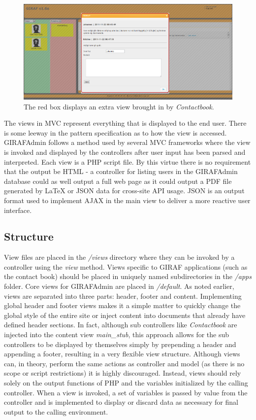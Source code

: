 \begin{figure}
    \begin{center}
    \includegraphics[scale=0.45,angle=90]{img/mvc_details/mvc_detailed_views2_view}
    \caption{\label{implementation_view_views2}The red box displays an extra view brought in by \emph{Contactbook}.}
    \end{center}
\end{figure}

The views in MVC represent everything that is displayed to the end user. There is some leeway in the pattern specification as to how the view is accessed. GIRAFAdmin follows a method used by several MVC frameworks where the view is invoked and displayed by the controllers after user input has been parsed and interpreted. Each view is a PHP script file. By this virtue there is no requirement that the output be HTML - a controller for listing users in the GIRAFAdmin database could as well output a full web page as it could output a PDF file generated by LaTeX or JSON data for cross-site API usage. JSON is an output format used to implement AJAX in the main view to deliver a more reactive user interface.

\subsection{Structure}
View files are placed in the \emph{/views} directory where they can be invoked by a controller using the \emph{view} method. Views specific to GIRAF applications (such as the contact book) should be placed in uniquely named subdirectories in the \emph{/apps} folder. Core views for GIRAFAdmin are placed in \emph{/default}.
As noted earlier, views are separated into three parts: header, footer and content. Implementing global header and footer views makes it a simple matter to quickly change the global style of the entire site or inject content into documents that already have defined header sections. In fact, although sub controllers like \emph{Contactbook} are injected into the content view \emph{main\_stub}, this approach allows for the sub controllers to be displayed by themselves simply by prepending a header and appending a footer, resulting in a very flexible view structure.
Although views can, in theory, perform the same actions as controller and model (as there is no scope or script restrictions) it is highly discouraged. Instead, views should rely solely on the output functions of PHP and the variables initialized by the calling controller. When a view is invoked, a set of variables is passed by value from the controller and is implemented to display or discard data as necessary for final output to the calling environment.

